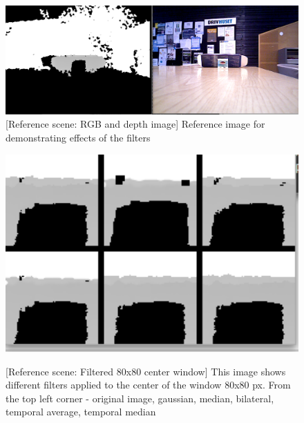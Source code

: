 \documentclass[11pt]{article}
\begin{document}
\begin{figure}[ht]
  \centering
  \includegraphics[width=1\textwidth]{figures/reference_rgb_depth.png}
  [Reference scene: RGB and depth image]{\label{fig:refimage}
    Reference image for demonstrating effects of the filters}
\end{figure}
\begin{figure}[ht]
  \centering
  \includegraphics[width=1\textwidth]{figures/applied_filters_center.png}
  
  [Reference scene: Filtered 80x80 center
  window]{\label{fig:filterswindow} This image shows different filters applied
    to the center of the window 80x80 px. From the top left corner - original
    image, gaussian, median, bilateral, temporal average, temporal median}
\end{figure}
\end{document}
